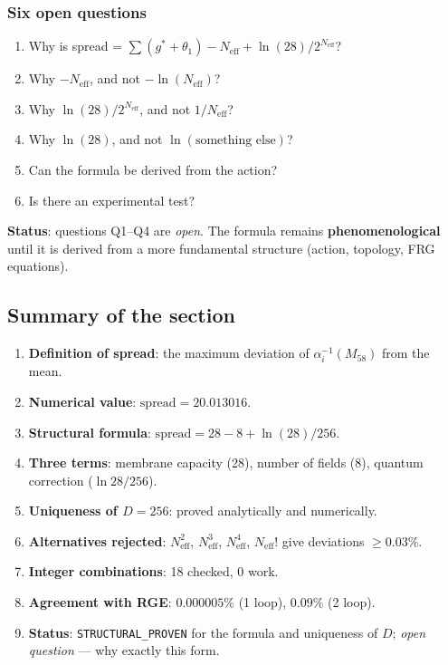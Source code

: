 \documentclass[11pt,a4paper]{article}
\theoremstyle{definition}
\begin{document}
\subsubsection{Six open questions}

\begin{enumerate}
    \item[Q1:] Why is spread = $\sum(g^* + \theta_1) - N_{\text{eff}}
          + \ln(28)/2^{N_{\text{eff}}}$?
    \item[Q2:] Why $-N_{\text{eff}}$, and not $-\ln(N_{\text{eff}})$?
    \item[Q3:] Why $\ln(28)/2^{N_{\text{eff}}}$, and not $1/N_{\text{eff}}$?
    \item[Q4:] Why $\ln(28)$, and not $\ln(\text{something else})$?
    \item[Q5:] Can the formula be derived from the action?
    \item[Q6:] Is there an experimental test?
\end{enumerate}

\medskip\noindent
\textbf{Status}: questions Q1--Q4 are \emph{open}.
The formula remains \textbf{phenomenological} until
it is derived from a more fundamental structure
(action, topology, FRG equations).

\subsection{Summary of the section}
\label{subsec:spread-summary}

\begin{enumerate}
    \item \textbf{Definition of spread}: the maximum deviation
          of $\alpha_i^{-1}(M_{58})$ from the mean.
    \item \textbf{Numerical value}: $\text{spread} = 20.013016$.
    \item \textbf{Structural formula}:
          $\text{spread} = 28 - 8 + \ln(28)/256$.
    \item \textbf{Three terms}: membrane capacity (28),
          number of fields (8), quantum correction ($\ln 28/256$).
    \item \textbf{Uniqueness of $D = 256$}: proved
          analytically and numerically.
    \item \textbf{Alternatives rejected}: $N_{\text{eff}}^2$,
          $N_{\text{eff}}^3$, $N_{\text{eff}}^4$, $N_{\text{eff}}!$
          give deviations $\geq 0.03\%$.
    \item \textbf{Integer combinations}: 18 checked,
          0 work.
    \item \textbf{Agreement with RGE}: $0.000005\%$ (1 loop),
          $0.09\%$ (2 loop).
    \item \textbf{Status}: \texttt{STRUCTURAL\_PROVEN} for
          the formula and uniqueness of $D$; \emph{open question} ---
          why exactly this form.
\end{enumerate}
\end{document}

